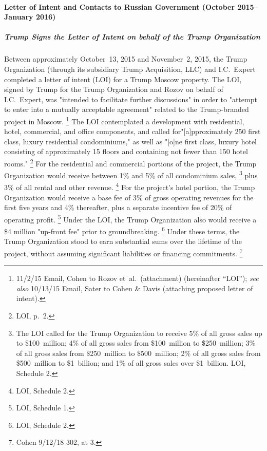 \paragraph{Letter of Intent and Contacts to Russian Government (October 2015--January 2016)}

\subparagraph{Trump Signs the Letter of Intent on behalf of the Trump Organization}

Between approximately October~13, 2015 and November~2, 2015, the Trump Organization (through its subsidiary Trump Acquisition, LLC) and I.C.~Expert completed a letter of intent (LOI) for a Trump Moscow property.
The LOI, signed by Trump for the Trump Organization and Rozov on behalf of I.C.~Expert, was "intended to facilitate further discussions" in order to "attempt to enter into a mutually acceptable agreement" related to the Trump-branded project in Moscow.%
\footnote{11/2/15 Email, Cohen to Rozov et~al.\ (attachment) (hereinafter “LOI”);
\textit{see also} 10/13/15 Email, Sater to Cohen \& Davis (attaching proposed letter of intent).}
The LOI contemplated a development with residential, hotel, commercial, and office components, and called for"[a]pproximately 250 first class, luxury residential condominiums," as well as "[o]ne first class, luxury hotel consisting of approximately 15 floors and containing not fewer than 150 hotel rooms."%
\footnote{LOI, p.~2.}
For the residential and commercial portions of the project, the Trump Organization would receive between 1\% and 5\% of all condominium sales,%
\footnote{The LOI called for the Trump Organization to receive 5\% of all gross sales up to \$100~million;
4\% of all gross sales from \$100~million to \$250~million;
3\% of all gross sales from \$250~million to \$500~million;
2\% of all gross sales from \$500~million to \$1~billion;
and 1\% of all gross sales over \$1~billion.
LOI, Schedule 2.}
plus 3\% of all rental and other revenue.%
\footnote{LOI, Schedule 2.}
For the project's hotel portion, the Trump Organization would receive a base fee of 3\% of gross operating revenues for the first five years and 4\% thereafter, plus a separate incentive fee of 20\% of operating profit.%
\footnote{LOI, Schedule 1.}
Under the LOI, the Trump Organization also would receive a \$4 million "up-front fee" prior to groundbreaking.%
\footnote{LOI, Schedule 2.}
Under these terms, the Trump Organization stood to earn substantial sums over the lifetime of the project, without assuming significant liabilities or financing commitments.%
\footnote{Cohen 9/12/18 302, at 3.}

